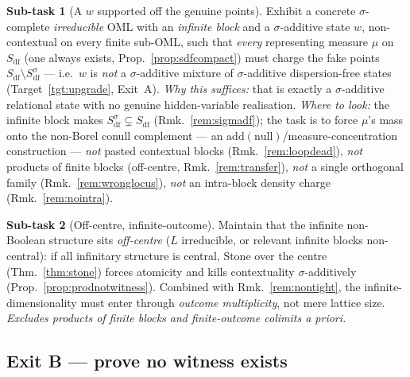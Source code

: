 \documentclass[11pt]{article}
\theoremstyle{definition}
\newtheorem{task}{Sub-task}
\theoremstyle{remark}
\newcommand{\df}{\mathrm{df}}            %
\begin{document}
\begin{task}[A $w$ supported off the genuine points]\label{task:escape}
Exhibit a concrete $\sigma$-complete \emph{irreducible} OML with an \emph{infinite
block} and a $\sigma$-additive state $w$, non-contextual on every finite sub-OML, such
that \emph{every} representing measure $\mu$ on $S_{\df}$ (one always exists,
Prop.~\ref{prop:sdfcompact}) must charge the fake points
$S_{\df}\setminus S_{\df}^{\sigma}$ --- i.e.\ $w$ is \emph{not} a $\sigma$-additive
mixture of $\sigma$-additive dispersion-free states (Target~\ref{tgt:upgrade},
Exit~A). \emph{Why this suffices:} that is exactly a $\sigma$-additive relational
state with no genuine hidden-variable realisation. \emph{Where to look:} the infinite
block makes $S_{\df}^{\sigma}\subsetneq S_{\df}$ (Rmk.~\ref{rem:sigmadf}); the task is
to force $\mu$'s mass onto the non-Borel conull complement --- an
$\mathrm{add}(\mathrm{null})$/measure-concentration construction --- \emph{not} pasted
contextual blocks (Rmk.~\ref{rem:loopdead}), \emph{not} products of finite blocks
(off-centre, Rmk.~\ref{rem:transfer}), \emph{not} a single orthogonal family
(Rmk.~\ref{rem:wronglocus}), \emph{not} an intra-block density charge
(Rmk.~\ref{rem:nointra}).
\end{task}

\begin{task}[Off-centre, infinite-outcome]\label{task:offcentre}
Maintain that the infinite non-Boolean structure sits \emph{off-centre} ($L$
irreducible, or relevant infinite blocks non-central): if all infinitary structure
is central, Stone over the centre (Thm.~\ref{thm:stone}) forces atomicity and kills
contextuality $\sigma$-additively (Prop.~\ref{prop:prodnotwitness}). Combined with
Rmk.~\ref{rem:nontight}, the infinite-dimensionality must enter through
\emph{outcome multiplicity}, not mere lattice size. \emph{Excludes products of
finite blocks and finite-outcome colimits a priori.}
\end{task}

\subsection*{Exit B --- prove no witness exists}
\end{document}
